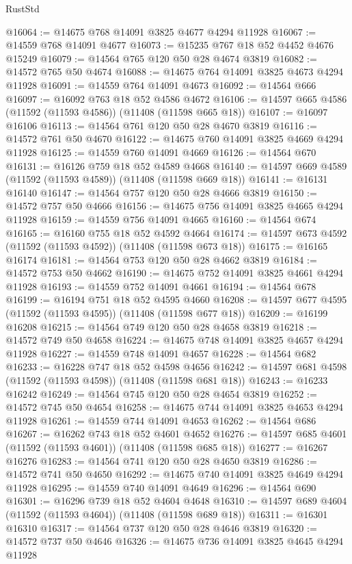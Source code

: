 \begin{lexlean}{RustStd}
\begin{coremodule}
@16064 := @14675 @768 @14091 @3825 @4677 @4294 @11928
@16067 := @14559 @768 @14091 @4677
@16073 := @15235 @767 @18 @52 @4452 @4676 @15249
@16079 := @14564 @765 @120 @50 @28 @4674 @3819
@16082 := @14572 @765 @50 @4674
@16088 := @14675 @764 @14091 @3825 @4673 @4294 @11928
@16091 := @14559 @764 @14091 @4673
@16092 := @14564 @666
@16097 := @16092 @763 @18 @52 @4586 @4672
@16106 := @14597 @665 @4586 (@11592 (@11593 @4586)) (@11408 (@11598 @665 @18))
@16107 := @16097 @16106
@16113 := @14564 @761 @120 @50 @28 @4670 @3819
@16116 := @14572 @761 @50 @4670
@16122 := @14675 @760 @14091 @3825 @4669 @4294 @11928
@16125 := @14559 @760 @14091 @4669
@16126 := @14564 @670
@16131 := @16126 @759 @18 @52 @4589 @4668
@16140 := @14597 @669 @4589 (@11592 (@11593 @4589)) (@11408 (@11598 @669 @18))
@16141 := @16131 @16140
@16147 := @14564 @757 @120 @50 @28 @4666 @3819
@16150 := @14572 @757 @50 @4666
@16156 := @14675 @756 @14091 @3825 @4665 @4294 @11928
@16159 := @14559 @756 @14091 @4665
@16160 := @14564 @674
@16165 := @16160 @755 @18 @52 @4592 @4664
@16174 := @14597 @673 @4592 (@11592 (@11593 @4592)) (@11408 (@11598 @673 @18))
@16175 := @16165 @16174
@16181 := @14564 @753 @120 @50 @28 @4662 @3819
@16184 := @14572 @753 @50 @4662
@16190 := @14675 @752 @14091 @3825 @4661 @4294 @11928
@16193 := @14559 @752 @14091 @4661
@16194 := @14564 @678
@16199 := @16194 @751 @18 @52 @4595 @4660
@16208 := @14597 @677 @4595 (@11592 (@11593 @4595)) (@11408 (@11598 @677 @18))
@16209 := @16199 @16208
@16215 := @14564 @749 @120 @50 @28 @4658 @3819
@16218 := @14572 @749 @50 @4658
@16224 := @14675 @748 @14091 @3825 @4657 @4294 @11928
@16227 := @14559 @748 @14091 @4657
@16228 := @14564 @682
@16233 := @16228 @747 @18 @52 @4598 @4656
@16242 := @14597 @681 @4598 (@11592 (@11593 @4598)) (@11408 (@11598 @681 @18))
@16243 := @16233 @16242
@16249 := @14564 @745 @120 @50 @28 @4654 @3819
@16252 := @14572 @745 @50 @4654
@16258 := @14675 @744 @14091 @3825 @4653 @4294 @11928
@16261 := @14559 @744 @14091 @4653
@16262 := @14564 @686
@16267 := @16262 @743 @18 @52 @4601 @4652
@16276 := @14597 @685 @4601 (@11592 (@11593 @4601)) (@11408 (@11598 @685 @18))
@16277 := @16267 @16276
@16283 := @14564 @741 @120 @50 @28 @4650 @3819
@16286 := @14572 @741 @50 @4650
@16292 := @14675 @740 @14091 @3825 @4649 @4294 @11928
@16295 := @14559 @740 @14091 @4649
@16296 := @14564 @690
@16301 := @16296 @739 @18 @52 @4604 @4648
@16310 := @14597 @689 @4604 (@11592 (@11593 @4604)) (@11408 (@11598 @689 @18))
@16311 := @16301 @16310
@16317 := @14564 @737 @120 @50 @28 @4646 @3819
@16320 := @14572 @737 @50 @4646
@16326 := @14675 @736 @14091 @3825 @4645 @4294 @11928

\end{coremodule}
\end{lexlean}
